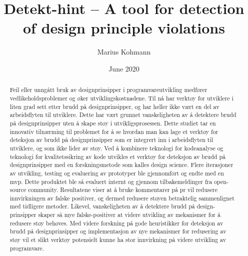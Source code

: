 \documentclass{report}
\title{Detekt-hint -- A tool for detection of design principle violations}
\author{Marius Kohmann}
\date{June 2020}
\begin{document}
\maketitle


\begin{abstract}
    Feil eller unngått bruk av designprinsipper i programvareutvikling medfører vedlikeholdsproblemer og øker utviklingskostnadene. Til nå har verktøy for utviklere i liten grad sett etter brudd på designprinsipper, og har heller ikke vært en del av arbeidsflyten til utviklere. Dette har vært grunnet vanskeligheten av å detektere brudd på designprinsipper uten å skape støy i utvikligsprosessen. Dette studiet tar en innovativ tilnærming til problemet for å se hvordan man kan lage et verktøy for deteksjon av brudd på designprinsipper som er integrert inn i arbeidsflyten til utviklere, og som ikke lider av støy. Ved å kombinere teknologi for kodeanalyse og teknologi for kvalitetssikring av kode utvikles et verktøy for deteksjon av brudd på designprinsipper med en forskningsmetode som kalles design science. Flere iterasjoner av utvikling, testing og evaluering av prototyper ble gjennomført og endte med en \gls{mvp}. Dette produktet ble så evaluert internt og gjennom tilbakemeldinger fra open-source community. Resultatene viser at å bruke kommentarer på \acrfull{pr} vil redusere innvirkningen av falske positiver, og dermed redusere støyen betraktelig sammenlignet med tidligere metoder. Likevel, vanskeligheten av å detektere brudd på design-prinsipper skaper så mye falske-positiver at videre utvikling av mekanismer for å redusere støy behøves. Med videre forskning på gode heuristikker for deteksjon av brudd på designprinsipper og implementasjon av nye mekanismer for redusering av støy vil et slikt verktøy potensielt kunne ha stor innvirkning på videre utvikling av programvare.  
    
\end{abstract}
\end{document}
